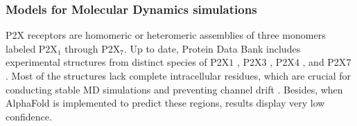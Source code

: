 \documentclass[9pt]{elife}
\begin{document}
	\subsubsection{Models for Molecular Dynamics simulations}
	\label{sec:model_const}
	
	P2X receptors are homomeric or heteromeric assemblies of three monomers labeled P2X${_1}$ through P2X${_7}$. Up to date, Protein Data Bank includes experimental structures from distinct species of P2X${1}$ \cite{bennetts2024structural}, P2X${3}$ \cite{cristal_p2x3, wang2018,li2019,thach2025mechanistic,kim2024discovery}, P2X${4}$ \cite{abierta_p2x,cerrada_p2x,shen2023structural,shi2025human}, and P2X${7}$ \cite{mccarthy2019full,binding_zn_2016,karasawa2016,sheng2024structural,oken2024high,oken2024p2x7}. Most of the structures lack complete intracellular residues, which are crucial for conducting stable MD simulations and preventing channel drift \cite{piedominici_p2x_1}. Besides, when AlphaFold \cite{af3} is implemented to predict these regions, results display very low confidence.  
	
\end{document}
